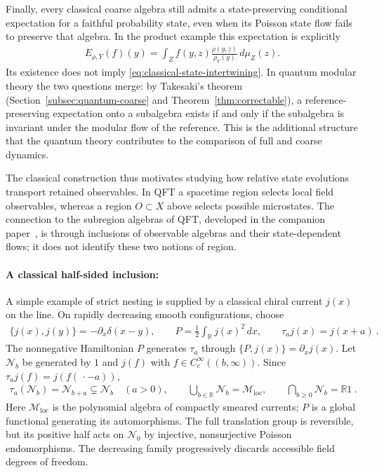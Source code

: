 \documentclass[a4paper,11pt]{article}
\theoremstyle{definition}
\begin{document}
Finally, every classical coarse algebra still admits a state-preserving conditional expectation for a faithful probability state, even when its Poisson state flow fails to preserve that algebra. In the product example this expectation is explicitly
\begin{align}
    E_{\rho,Y}(f)(y)=\int_Z f(y,z)\frac{\rho(y,z)}{\rho_Y(y)}\,d\mu_Z(z).
\end{align}
Its existence does not imply \eqref{eq:classical-state-intertwining}. In quantum modular theory the two questions merge: by Takesaki's theorem (Section~\ref{subsec:quantum-coarse} and Theorem~\ref{thm:correctable}), a reference-preserving expectation onto a subalgebra exists if and only if the subalgebra is invariant under the modular flow of the reference. This is the additional structure that the quantum theory contributes to the comparison of full and coarse dynamics.

The classical construction thus motivates studying how relative state evolutions transport retained observables. In QFT a spacetime region selects local field observables, whereas a region $O\subset X$ above selects possible microstates. The connection to the subregion algebras of QFT, developed in the companion paper~\cite{companionQFT}, is through inclusions of observable algebras and their state-dependent flows; it does not identify these two notions of region.

\paragraph{A classical half-sided inclusion:}
A simple example of strict nesting is supplied by a classical chiral current $j(x)$ on the line. On rapidly decreasing smooth configurations, choose
\begin{align}
    \{j(x),j(y)\}=-\partial_x\delta(x-y),
    \qquad P=\frac12\int_{\mathbb R}j(x)^2\,dx,
    \qquad \tau_a j(x)=j(x+a)\ .
\end{align}
The nonnegative Hamiltonian $P$ generates $\tau_a$ through $\{P,j(x)\}=\partial_xj(x)$. Let $\mathcal N_b$ be generated by $1$ and $j(f)$ with $f\in C_c^\infty((b,\infty))$. Since $\tau_a j(f)=j(f(\,\cdot-a))$,
\begin{align}
    \tau_a(\mathcal N_b)=\mathcal N_{b+a}\subsetneq\mathcal N_b\quad(a>0),
    \qquad
    \bigcup_{b\in\mathbb R}\mathcal N_b=\mathcal M_{\mathrm{loc}},
    \qquad
    \bigcap_{b\geq0}\mathcal N_b=\mathbb R1\ .
\end{align}
Here $\mathcal M_{\mathrm{loc}}$ is the polynomial algebra of compactly smeared currents; $P$ is a global functional generating its automorphisms. The full translation group is reversible, but its positive half acts on $\mathcal N_0$ by injective, nonsurjective Poisson endomorphisms. The decreasing family progressively discards accessible field degrees of freedom.
\end{document}
